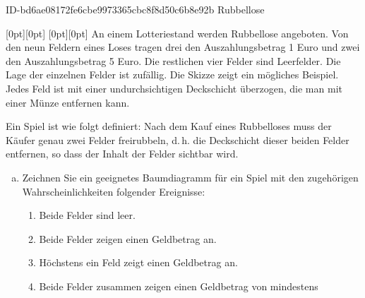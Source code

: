 \begin{exercise}
      {ID-bd6ae08172fe6cbe9973365cbc8f8d50c6b8e92b}
      {Rubbellose}
  \ifproblem\problem\par
    \raisebox{1.66ex}[0pt][0pt]%
    {%
      \raisebox{-3cm}[0pt][0pt]%
      {%
      }%
    }%
    An einem Lotteriestand werden Rubbellose
    angeboten. Von den neun Feldern eines Loses
    tragen drei den Auszahlungsbetrag 1 Euro
    und zwei den  Auszahlungsbetrag 5 Euro.
    Die restlichen vier Felder sind Leerfelder.
    Die Lage der einzelnen Felder ist zufällig.
    Die Skizze zeigt ein mögliches Beispiel.
    Jedes Feld ist mit einer undurchsichtigen
    Deckschicht überzogen, die man mit einer
    Münze entfernen kann.
    \par
    Ein Spiel ist wie folgt definiert:
    Nach dem Kauf eines Rubbelloses muss der
    Käufer genau zwei Felder freirubbeln,
    d.\,h. die Deckschicht dieser beiden
    Felder entfernen, so dass der Inhalt
    der Felder sichtbar wird.
    \begin{enumerate}[a)]
      \item Zeichnen Sie ein geeignetes Baumdiagramm
            für ein Spiel mit den zugehörigen
            Wahrscheinlichkeiten folgender Ereignisse:
            \begin{enumerate}[A:]
              \setlength{\itemsep}{-1ex}%
              \item Beide Felder sind leer.
              \item Beide Felder zeigen einen
                    Geldbetrag an.
              \item Höchstens ein Feld zeigt einen
                    Geldbetrag an.
              \item Beide Felder zusammen zeigen
                    einen Geldbetrag von mindestens

\end{enumerate}
\end{enumerate}
\end{exercise}
